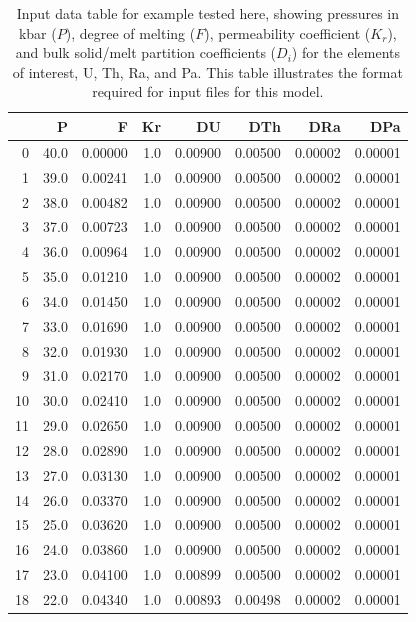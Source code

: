 \documentclass[draft]{agujournal2019}
\begin{document}
\begin{table}[H]
\caption{Input data table for example tested here, showing
pressures in kbar ($P$), degree of melting ($F$), permeability
coefficient ($K_r$), and bulk solid/melt partition coefficients
($D_i$) for the elements of interest, U, Th, Ra, and Pa.
This table illustrates the format required for input files for this model.}
\centering
\begin{tabular}{r | r | r | r | r | r | r | r}
\hline
 & P & F & Kr & DU & DTh & DRa & DPa \\
\hline
0  & 40.0 & 0.00000 & 1.0 & 0.00900 & 0.00500 & 0.00002 & 0.00001 \\
1  & 39.0 & 0.00241 & 1.0 & 0.00900 & 0.00500 & 0.00002 & 0.00001 \\
2  & 38.0 & 0.00482 & 1.0 & 0.00900 & 0.00500 & 0.00002 & 0.00001 \\
3  & 37.0 & 0.00723 & 1.0 & 0.00900 & 0.00500 & 0.00002 & 0.00001 \\
4  & 36.0 & 0.00964 & 1.0 & 0.00900 & 0.00500 & 0.00002 & 0.00001 \\
5  & 35.0 & 0.01210 & 1.0 & 0.00900 & 0.00500 & 0.00002 & 0.00001 \\
6  & 34.0 & 0.01450 & 1.0 & 0.00900 & 0.00500 & 0.00002 & 0.00001 \\
7  & 33.0 & 0.01690 & 1.0 & 0.00900 & 0.00500 & 0.00002 & 0.00001 \\
8  & 32.0 & 0.01930 & 1.0 & 0.00900 & 0.00500 & 0.00002 & 0.00001 \\
9  & 31.0 & 0.02170 & 1.0 & 0.00900 & 0.00500 & 0.00002 & 0.00001 \\
10 & 30.0 & 0.02410 & 1.0 & 0.00900 & 0.00500 & 0.00002 & 0.00001 \\
11 & 29.0 & 0.02650 & 1.0 & 0.00900 & 0.00500 & 0.00002 & 0.00001 \\
12 & 28.0 & 0.02890 & 1.0 & 0.00900 & 0.00500 & 0.00002 & 0.00001 \\
13 & 27.0 & 0.03130 & 1.0 & 0.00900 & 0.00500 & 0.00002 & 0.00001 \\
14 & 26.0 & 0.03370 & 1.0 & 0.00900 & 0.00500 & 0.00002 & 0.00001 \\
15 & 25.0 & 0.03620 & 1.0 & 0.00900 & 0.00500 & 0.00002 & 0.00001 \\
16 & 24.0 & 0.03860 & 1.0 & 0.00900 & 0.00500 & 0.00002 & 0.00001 \\
17 & 23.0 & 0.04100 & 1.0 & 0.00899 & 0.00500 & 0.00002 & 0.00001 \\
18 & 22.0 & 0.04340 & 1.0 & 0.00893 & 0.00498 & 0.00002 & 0.00001 \\

\end{tabular}
\end{table}
\end{document}
